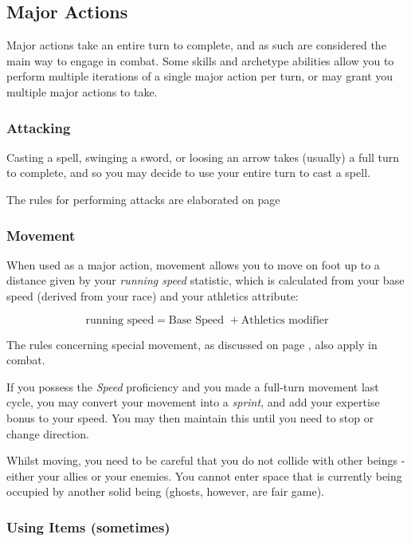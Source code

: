  \subsection{Major Actions}
 
 Major actions take an entire turn to complete, and as such are considered the main way to engage in combat. Some skills and archetype abilities allow you to perform multiple iterations of a single major action per turn, or may grant you multiple major actions to take. 
 
 \subsubsection{Attacking}
 
 Casting a spell, swinging a sword, or loosing an arrow takes (usually) a full turn to complete, and so you may decide to use your entire turn to cast a spell. 
 
The rules for performing attacks are elaborated on page \pageref{S:Attacks}
 \subsubsection{Movement}
 
 When used as a major action, movement allows you to move on foot up to a distance given by your {\it running speed} statistic, which is calculated from your base speed (derived from your race) and your athletics attribute:
 
\small
$$ \text{running speed} = \text{Base Speed } + \text{Athletics modifier} $$  
\normalsize

The rules concerning special movement, as discussed on page \pageref{S:SpecialMovement}, also apply in combat. 

If you possess the {\it Speed} proficiency and you made a full-turn movement last cycle, you may convert your movement into a {\it sprint}, and add your expertise bonus to your speed. You may then maintain this until you need to stop or change direction. 

Whilst moving, you need to be careful that you do not collide with other beings - either your allies or your enemies. You cannot enter space that is currently being occupied by another solid being (ghosts, however, are fair game). 

 \subsubsection{Using Items (sometimes)}
 
